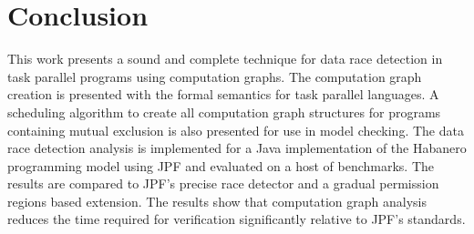 \section{Conclusion} \label{sec:conclusion}
This work presents a sound and complete technique for data race detection in task parallel programs using computation graphs.  The computation graph creation is presented with the formal semantics for task parallel languages. A scheduling algorithm to create all computation graph structures for programs containing mutual exclusion is also presented for use in model checking. The data race detection analysis is implemented for a Java implementation of the Habanero programming model using JPF and evaluated on a host of benchmarks. The results are compared to JPF's precise race detector and a gradual permission regions based extension. The results show that computation graph analysis reduces the time required for verification significantly relative to JPF's standards. 

\begin{comment}
This work can be extended in the following ways:
\begin{itemize}
\item The data race detector based on computation graphs explores just one control flow path that is taken by the program execution based on the input. The listener can be extended to explore other control flow paths by using Symbolic Execution.
\item The computation graphs can be created statically using program instrumentation and analyzed to gain performance improvements.
\end{itemize}
\end{comment}
